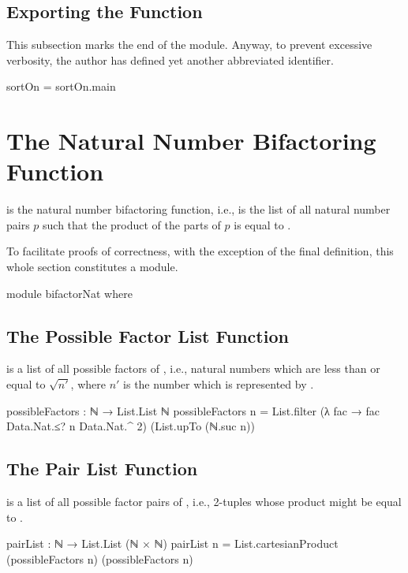 \documentclass{report}
\begin{document}
\subsection{Exporting the Function}
This subsection marks the end of the  module.  Anyway, to prevent excessive verbosity, the author has defined yet another abbreviated identifier.

\begin{code}
sortOn = sortOn.main
\end{code}

\section{The Natural Number Bifactoring Function}
 is the natural number bifactoring function, i.e.,   is the list of all natural number pairs \(p\) such that the product of the parts of \(p\) is equal to .

To facilitate proofs of correctness, with the exception of the final definition, this whole section constitutes a module.

\begin{code}
module bifactorNat where
\end{code}

\subsection{The Possible Factor List Function}
  is a list of all possible factors of , i.e., natural numbers which are less than or equal to \(\sqrt{n\prime}\), where \(n\prime\) is the number which is represented by .

\begin{code}
  possibleFactors : ℕ → List.List ℕ
  possibleFactors n = List.filter (λ fac → fac Data.Nat.≤? n Data.Nat.^ 2)
                                  (List.upTo (ℕ.suc n))
\end{code}

\subsection{The Pair List Function}
  is a list of all possible factor pairs of , i.e., 2-tuples whose product might be equal to .

\begin{code}
  pairList : ℕ → List.List (ℕ × ℕ)
  pairList n = List.cartesianProduct (possibleFactors n) (possibleFactors n)
\end{code}
\end{document}
